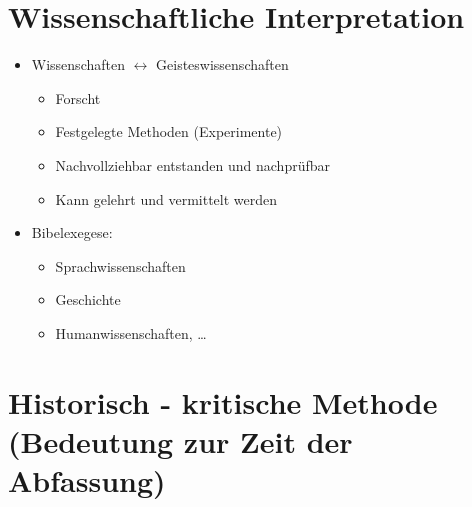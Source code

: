 \documentclass[11pt, paper=a4, twocolumn]{scrartcl}
\begin{document}
	\section{Wissenschaftliche Interpretation}

	\begin{itemize}
		\item Wissenschaften $\leftrightarrow$ Geisteswissenschaften
			\begin{itemize}
				\item Forscht
				\item Festgelegte Methoden (Experimente)
				\item Nachvollziehbar entstanden und nachprüfbar
				\item Kann gelehrt und vermittelt werden
			\end{itemize}
		\item Bibelexegese:
			\begin{itemize}
				\item Sprachwissenschaften
				\item Geschichte
				\item Humanwissenschaften, \dots
			\end{itemize}
	\end{itemize}

	\section{Historisch - kritische Methode (Bedeutung zur Zeit der Abfassung)}
\end{document}
